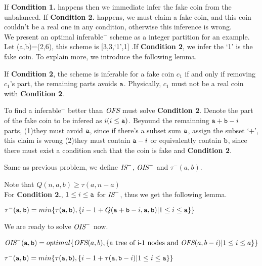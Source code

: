 If \textbf{Condition 1.} happens then we immediate infer the fake coin from the unbalanced.
If \textbf{Condition 2.} happens, we must claim a fake coin, and this coin couldn't be a real one in any condition, otherwise this inference is wrong.\\

We present an optimal inferable$^-$ scheme as a integer partition for an example. Let (a,b)=(2,6), 
this scheme is [3,3,`1',1] .If \textbf{Condition 2}, we infer the `1' is the fake coin. To explain more, we introduce the following lemma.

\begin{lemma}\label{lma:inferable}
If \textbf{Condition 2}, the scheme is inferable for a fake coin $c_1$ if and only if removing $c_1$'s part, the remaining parts avoids $\mathtt{a}$. Physically, $c_1$ must not be a real coin with \textbf{Condition 2}.
\end{lemma}

To find a inferable$^-$ better than $\text{\it OFS}$ must solve \textbf{Condition 2}.
Denote the part of the fake coin to be infered as $i(i\leq\mathtt{a})$. 
Beyound the remainning $\mathtt{a}+\mathtt{b}-i$ parts, 
(1)they must avoid $\mathtt{a}$, since if there's a subset sum $\mathtt{a}$, assign the subset `$+$', this claim is wrong
(2)they must contain $\mathtt{a}-i$ or equivalently contain $\mathtt{b}$, since there must exist a condition such that the coin is fake and \textbf{Condition 2}.


\begin{definition}
Same as previous problem, we define $\text{\it IS}^-$, $\text{\it OIS}^-$ and $\tau^-(a,b)$.
\end{definition}

Note that $Q(n,a,b)\geq\tau(a,n-a)$\\

For \textbf{Condition 2.}, $1\leq i\leq\mathtt{a}$ for $\text{\it IS}^-$, thus we get the following lemma.

\begin{lemma}
$\tau^-(\mathtt{a},\mathtt{b})=min\{\tau(\mathtt{a},\mathtt{b}), \{i-1+Q(\mathtt{a}+\mathtt{b}-i,\mathtt{a},\mathtt{b}) | 1\leq i\leq\mathtt{a}\} \}$
\end{lemma}

We are ready to solve $\text{\it OIS}^-$ now.

\begin{theorem}
$\text{\it OIS}^-(\mathtt{a},\mathtt{b})=optimal\{\text{\it OFS}(a,b), \{\text{a tree of i-1 nodes and }\text{\it OFS}(a,b-i) |1\leq i\leq a\}\}$

$\tau^-(\mathtt{a},\mathtt{b})=min\{\tau(\mathtt{a},\mathtt{b}), \{i-1+\tau(\mathtt{a},\mathtt{b}-i) | 1\leq i\leq\mathtt{a}\} \}$
\end{theorem}

